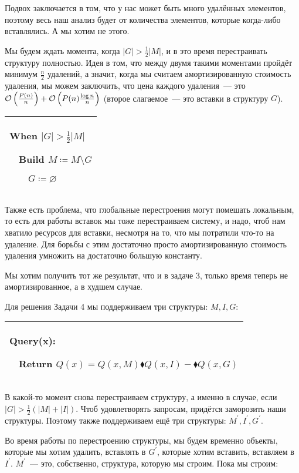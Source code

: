 Подвох заключается в том, что у нас может быть много удалённых элементов, поэтому весь наш анализ будет от количества элементов, которые когда-либо вставлялись. А мы хотим не этого.

Мы будем ждать момента, когда $|G| > \frac{1}{2}|M|$, и в это время перестраивать структуру полностью. Идея в том, что между двумя такими моментами пройдёт минимум $\frac{n}{2}$ удалений, а значит, когда мы считаем амортизированную стоимость удаления, мы можем заключить, что цена каждого удаления~--- это
$\mathcal{O}\left(\frac{P(n)}{n}\right) + \mathcal{O}\left(P(n)\frac{\log n}{n}\right)$ (второе слагаемое~--- это вставки в структуру $G$).


\begin{tabular}{|p{5cm}|}
	\hline

	When $|G| > \frac{1}{2}|M|$

	$\quad$Build $M \coloneqq M\setminus G$

	$\quad$$\quad$$G \coloneqq \varnothing$ \\

	\hline
\end{tabular}

Также есть проблема, что глобальные перестроения могут помешать локальным, то есть для работы вставок мы тоже перестраиваем систему, и надо, чтоб нам хватило ресурсов для вставки, несмотря на то, что мы потратили что-то на удаление. Для борьбы с этим достаточно просто амортизированную стоимость удаления умножить на достаточно большую константу.


\begin{task}
	Мы хотим получить тот же результат, что и в задаче 3, только время теперь не амортизированное, а в худшем случае.
\end{task}

Для решения Задачи 4 мы поддерживаем три структуры: $M, I, G$:


\begin{tabular}{|p{8cm}|}
	\hline
	Query(x):

	$\quad$Return $Q(x) = Q(x, M) \blacklozenge Q(x, I) - \blacklozenge Q(x, G)$ \\
	\hline
\end{tabular}


В какой-то момент снова перестраиваем структуру, а именно в случае, если $|G| > \frac{1}{2}(|M| + |I|)$. Чтоб удовлетворять запросам, придётся заморозить наши структуры. Поэтому также поддерживаем ещё три структуры: $M^\prime, I^\prime, G^\prime$.

Во время работы по перестроению структуры, мы будем временно объекты, которые мы хотим удалить, вставлять в $G^\prime$, которые хотим вставить, вставляем в $I^\prime$. $M^\prime$~--- это, собственно, структура, которую мы строим. Пока мы строим:


